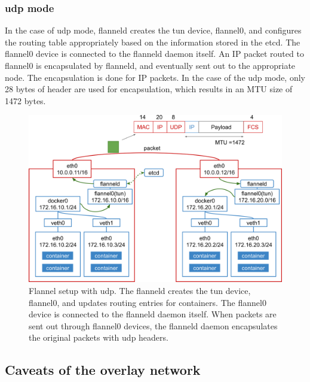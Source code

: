 \FloatBarrier

\subsubsection{udp mode}

In the case of udp mode, flanneld creates the tun device, flannel0, and configures the routing table appropriately based on the information stored in the etcd.
The flannel0 device is connected to the flanneld daemon itself.
An IP packet routed to flannel0 is encapsulated by flanneld, and eventually sent out 
to the appropriate node. 
The encapsulation is done for IP packets.
In the case of the udp mode, only 28 bytes of header are used for encapsulation, which results in an MTU size of 1472 bytes.

\begin{figure}[h]
  \centering
  \includegraphics[width=0.95\columnwidth]{Figs/flannel-udp}

  \par\bigskip
  \centering
  \begin{minipage}{0.9\columnwidth}
    \caption[Flannel setup with udp]{
      Flannel setup with udp.
      The flanneld creates the tun device, flannel0, and updates routing entries for containers.
      The flannel0 device is connected to the flanneld daemon itself.
      When packets are sent out through flannel0 devices, the flanneld daemon encapsulates the original packets with udp headers.
    }
    \label{Figs/flannel-udp}
  \end{minipage}
\end{figure}

\FloatBarrier

\subsection{Caveats of the overlay network}

